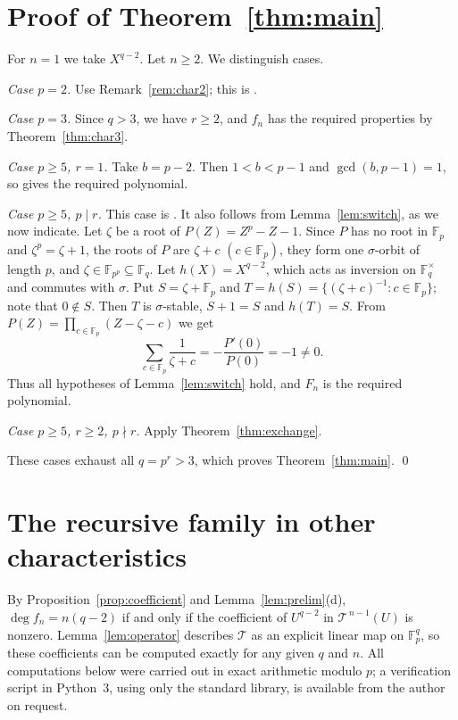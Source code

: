 \documentclass[11pt]{amsart}
\theoremstyle{definition}
\theoremstyle{remark}
\newcommand{\F}{\mathbb{F}}
\newcommand{\cT}{\mathcal{T}}
\begin{document}
\section{Proof of Theorem~\ref{thm:main}}\label{sec:proof}

For $n=1$ we take $X^{q-2}$. Let $n\ge2$. We distinguish cases.

\emph{Case $p=2$.} Use Remark~\ref{rem:char2}; this is \cite[Theorem~4]{GU25a}.

\emph{Case $p=3$.} Since $q>3$, we have $r\ge2$, and $f_n$ has the required properties by Theorem~\ref{thm:char3}.

\emph{Case $p\ge5$, $r=1$.} Take $b=p-2$. Then $1<b<p-1$ and $\gcd(b,p-1)=1$, so \cite[Theorem~5]{GU25a} gives the required polynomial.

\emph{Case $p\ge5$, $p\mid r$.} This case is \cite[Theorem~2]{GU25b}. It also follows from Lemma~\ref{lem:switch}, as we now indicate. Let $\zeta$ be a root of $P(Z)=Z^p-Z-1$. Since $P$ has no root in $\F_p$ and $\zeta^p=\zeta+1$, the roots of $P$ are $\zeta+c$ $(c\in\F_p)$, they form one $\sigma$-orbit of length $p$, and $\zeta\in\F_{p^p}\subseteq\F_q$. Let $h(X)=X^{q-2}$, which acts as inversion on $\F_q^\times$ and commutes with $\sigma$. Put $S=\zeta+\F_p$ and $T=h(S)=\{(\zeta+c)^{-1}:c\in\F_p\}$; note that $0\notin S$. Then $T$ is $\sigma$-stable, $S+1=S$ and $h(T)=S$. From $P(Z)=\prod_{c\in\F_p}(Z-\zeta-c)$ we get
\[
\sum_{c\in\F_p}\frac1{\zeta+c}=-\frac{P'(0)}{P(0)}=-1\ne0.
\]
Thus all hypotheses of Lemma~\ref{lem:switch} hold, and $F_n$ is the required polynomial.

\emph{Case $p\ge5$, $r\ge2$, $p\nmid r$.} Apply Theorem~\ref{thm:exchange}.

These cases exhaust all $q=p^r>3$, which proves Theorem~\ref{thm:main}. \qed

\section{The recursive family in other characteristics}\label{sec:counter}

By Proposition~\ref{prop:coefficient} and Lemma~\ref{lem:prelim}(d), $\deg f_n=n(q-2)$ if and only if the coefficient of $U^{q-2}$ in $\cT^{\,n-1}(U)$ is nonzero. Lemma~\ref{lem:operator} describes $\cT$ as an explicit linear map on $\F_p^q$, so these coefficients can be computed exactly for any given $q$ and $n$. All computations below were carried out in exact arithmetic modulo $p$; a verification script in Python~3, using only the standard library, is available from the author on request.
\end{document}
